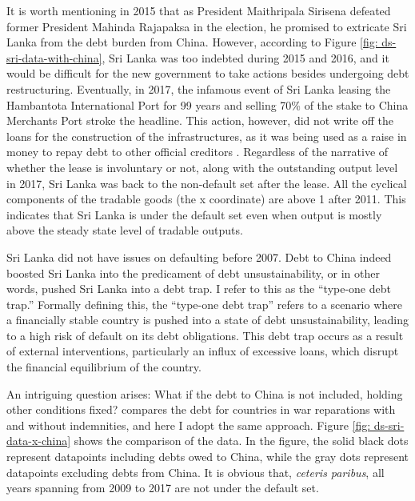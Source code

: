It is worth mentioning in 2015 that as President Maithripala Sirisena defeated former President Mahinda Rajapaksa in the election, he promised to extricate Sri Lanka from the debt burden from China. However, according to Figure \ref{fig: ds-sri-data-with-china}, Sri Lanka was too indebted during 2015 and 2016, and it would be difficult for the new government to take actions besides undergoing debt restructuring. Eventually, in 2017, the infamous event of Sri Lanka leasing the Hambantota International Port for 99 years and selling 70\% of the stake to China Merchants Port stroke the headline. This action, however, did not write off the loans for the construction of the infrastructures, as it was being used as a raise in money to repay debt to other official creditors \citep{Brautigam-meme-2020, Moramudali_2019}. Regardless of the narrative of whether the lease is involuntary or not, along with the outstanding output level in 2017, Sri Lanka was back to the non-default set after the lease.
All the cyclical components of the tradable goods (the x coordinate) are above 1 after 2011. This indicates that Sri Lanka is under the default set even when output is mostly above the steady state level of tradable outputs.

Sri Lanka did not have issues on defaulting before 2007. Debt to China indeed boosted Sri Lanka into the predicament of debt unsustainability, or in other words, pushed Sri Lanka into a debt trap. I refer to this as the ``type-one debt trap.'' Formally defining this, the ``type-one debt trap'' refers to a scenario where a financially stable country is pushed into a state of debt unsustainability, leading to a high risk of default on its debt obligations. This debt trap occurs as a result of external interventions, particularly an influx of excessive loans, which disrupt the financial equilibrium of the country.

An intriguing question arises: What if the debt to China is not included, holding other conditions fixed? \citet{Hinrichsen_2020-chapter4} compares the debt for countries in war reparations with and without indemnities, and here I adopt the same approach. Figure \ref{fig: ds-sri-data-x-china} shows the comparison of the data. In the figure, the solid black dots represent datapoints including debts owed to China, while the gray dots represent datapoints excluding debts from China.
It is obvious that, \emph{ceteris paribus}, all years spanning from 2009 to 2017 are not under the default set.

